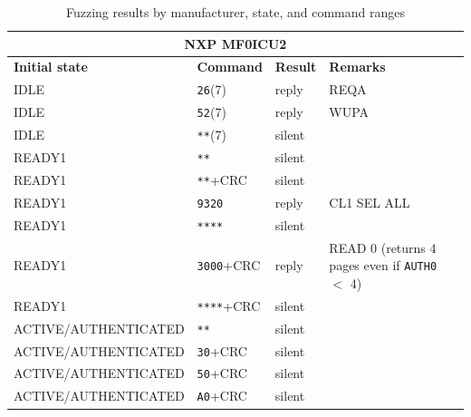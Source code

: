 \begin{longtable}{l l l l}
\caption{Fuzzing results by manufacturer, state, and command ranges} \label{tab:fuzz-full} \\
\multicolumn{4}{c}{\textbf{NXP MF0ICU2}}                                                                                  \\
\hline
\textbf{Initial state} & \textbf{Command} & \textbf{Result} & \textbf{Remarks} \\
\hline
IDLE                 & \texttt{26}(7)                      & reply           & REQA                                        \\
IDLE                 & \texttt{52}(7)                      & reply           & WUPA                                        \\
IDLE                 & \texttt{**}(7)                      & silent          &                                             \\
READY1               & \texttt{**}                         & silent          &                                             \\
READY1               & \texttt{**}+CRC                     & silent          &                                             \\
READY1               & \texttt{9320}                       & reply           & CL1 SEL ALL                                 \\
READY1               & \texttt{****}                       & silent          &                                             \\
READY1               & \texttt{3000}+CRC                   & reply           & READ 0 (returns 4 pages even if \texttt{AUTH0} $<$ 4)                        \\
READY1               & \texttt{****}+CRC                   & silent          &                                             \\
ACTIVE/AUTHENTICATED & \texttt{**}                         & silent          &                                             \\
ACTIVE/AUTHENTICATED & \texttt{30}+CRC                     & silent          &                                             \\
ACTIVE/AUTHENTICATED & \texttt{50}+CRC                     & silent          &                                             \\
ACTIVE/AUTHENTICATED & \texttt{A0}+CRC                     & silent          &                                             \\

\end{longtable}
